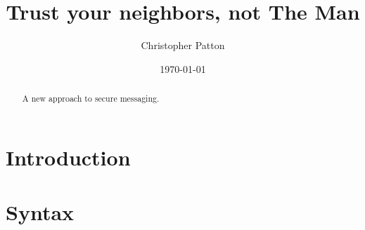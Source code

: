 \documentclass{llncs}
\date{\today}
\title{\textbf{Trust your neighbors, not The Man}}
\author{Christopher Patton}
\institute{University of Florida}
\begin{document}
\maketitle

\begin{abstract}
  A new approach to secure messaging.
\end{abstract}

\section{Introduction}


\section{Syntax}




\end{document}
